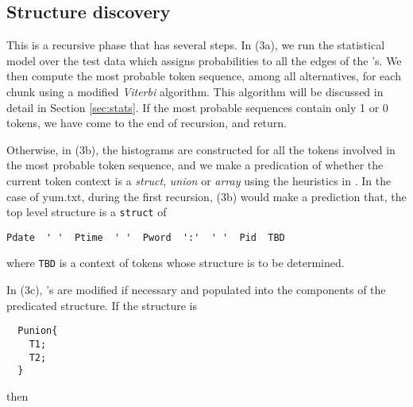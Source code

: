 \subsection{Structure discovery}
This is a recursive phase that has several steps.
In (3a), we run the statistical model over the test data
which assigns probabilities to all the edges of the \seqset's.
We then compute the most probable token sequence, among all alternatives,
for each chunk using a modified {\em Viterbi} algorithm. This algorithm
will be discussed in detail in Section \ref{sec:stats}.
If the most probable sequences contain only 1 or 0 tokens, we have come to
the end of recursion, and return.

Otherwise, in (3b), the histograms are constructed for
all the tokens involved in the most probable token sequence, and we
make a predication of whether the current token context is a {\em struct},
{\em union} or {\em array} using the heuristics in \cite{fisher+:dirttoshovels}. 
In the case of yum.txt, during the first
recursion, (3b) would make a prediction that, the top level structure is
a {\tt struct} of

{\small 
\begin{verbatim}
Pdate  ' '  Ptime  ' '  Pword  ':'  ' '  Pid  TBD
\end{verbatim}
}

where {\tt TBD} is a context of tokens whose structure is to be determined.

In (3c), \seqset's are modified if necessary and populated into the components of
the predicated structure. If the structure is 
{\small
\begin{verbatim}
  Punion{
    T1;
    T2;
  }
\end{verbatim}
}
then 
